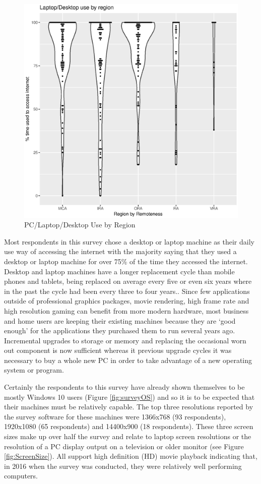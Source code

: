 \begin{figure}
\centering
\includegraphics[scale=0.5]{figures/VChart03-LaptopDesktopByRegion.eps}
\caption{PC/Laptop/Desktop Use by Region} \label{fig:VC03LaptopDesktopRegions}
\end{figure}
Most respondents in this survey chose a desktop or laptop machine as their daily use way of accessing the internet with the majority saying that they used a desktop or laptop machine for over 75\% of the time they accessed the internet. Desktop and laptop machines have a longer replacement cycle than mobile phones and tablets, being replaced on average every five or even six years where in the past the cycle had been every three to four years.\cite{RefWorks:370}. Since few applications outside of professional graphics packages, movie rendering, high frame rate and high resolution gaming can benefit from more modern hardware, most business and home users are keeping their existing machines because they are `good enough' for the applications they purchased them to run several years ago. Incremental upgrades to storage or memory and replacing the occasional worn out component is now sufficient whereas it previous upgrade cycles it was necessary to buy a whole new PC in order to take advantage of a new operating system or program.  


Certainly the respondents to this survey have already shown themselves to be mostly Windows 10 users (Figure \ref{fig:surveyOS}) and so it is to be expected that their machines must be relatively capable. The top three resolutions reported by the survey software for these machines were 1366x768 (93 respondents), 1920x1080 (65 respondents) and 14400x900 (18 respondents). These three screen sizes make up over half the survey and relate to laptop screen resolutions or the resolution of a PC display output on a television or older monitor (see Figure \ref{fig:ScreenSize}). All support high definition (HD) movie playback indicating that, in 2016 when the survey was conducted, they were relatively well performing computers.



